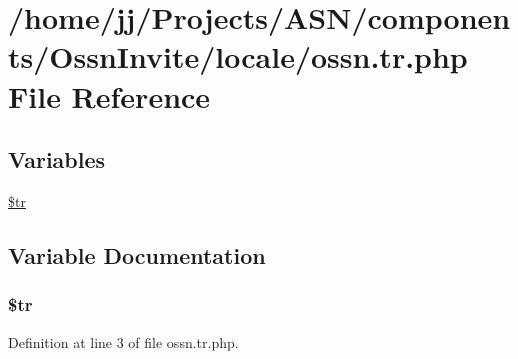 \hypertarget{components_2_ossn_invite_2locale_2ossn_8tr_8php}{}\section{/home/jj/\+Projects/\+A\+S\+N/components/\+Ossn\+Invite/locale/ossn.tr.\+php File Reference}
\label{components_2_ossn_invite_2locale_2ossn_8tr_8php}
\subsection*{Variables}
\begin{DoxyCompactItemize}
\item 
\hyperlink{components_2_ossn_invite_2locale_2ossn_8tr_8php_a925f466a276b200c71b2567d39b4dba7}{\$tr}
\end{DoxyCompactItemize}


\subsection{Variable Documentation}
\subsubsection[{\texorpdfstring{\$tr}{$tr}}]{\setlength{\rightskip}{0pt plus 5cm}\$tr}\hypertarget{components_2_ossn_invite_2locale_2ossn_8tr_8php_a925f466a276b200c71b2567d39b4dba7}{}\label{components_2_ossn_invite_2locale_2ossn_8tr_8php_a925f466a276b200c71b2567d39b4dba7}


Definition at line 3 of file ossn.\+tr.\+php.

